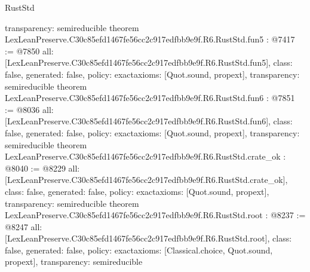 \begin{lexlean}{RustStd}
\begin{coremodule}
{  transparency: semireducible
}
theorem LexLeanPreserve.C30c85efd1467fe56cc2c917edfbb9e9f.R6.RustStd.fun5 : @7417 := @7850 {
  all: [LexLeanPreserve.C30c85efd1467fe56cc2c917edfbb9e9f.R6.RustStd.fun5],
  class: false,
  generated: false,
  policy: exact{axioms: [Quot.sound, propext]},
  transparency: semireducible
}
theorem LexLeanPreserve.C30c85efd1467fe56cc2c917edfbb9e9f.R6.RustStd.fun6 : @7851 := @8036 {
  all: [LexLeanPreserve.C30c85efd1467fe56cc2c917edfbb9e9f.R6.RustStd.fun6],
  class: false,
  generated: false,
  policy: exact{axioms: [Quot.sound, propext]},
  transparency: semireducible
}
theorem LexLeanPreserve.C30c85efd1467fe56cc2c917edfbb9e9f.R6.RustStd.crate_ok : @8040 := @8229 {
  all: [LexLeanPreserve.C30c85efd1467fe56cc2c917edfbb9e9f.R6.RustStd.crate_ok],
  class: false,
  generated: false,
  policy: exact{axioms: [Quot.sound, propext]},
  transparency: semireducible
}
theorem LexLeanPreserve.C30c85efd1467fe56cc2c917edfbb9e9f.R6.RustStd.root : @8237 := @8247 {
  all: [LexLeanPreserve.C30c85efd1467fe56cc2c917edfbb9e9f.R6.RustStd.root],
  class: false,
  generated: false,
  policy: exact{axioms: [Classical.choice, Quot.sound, propext]},
  transparency: semireducible
}


\end{coremodule}
\end{lexlean}
